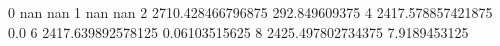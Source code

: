 0 nan nan
1 nan nan
2 2710.428466796875 292.849609375
4 2417.578857421875 0.0
6 2417.639892578125 0.06103515625
8 2425.497802734375 7.9189453125
